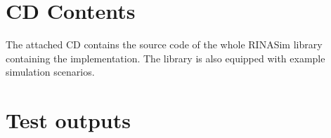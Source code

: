 \chapter{CD Contents}
    The attached CD contains the source code of the whole RINASim library containing the implementation. The library is also equipped with example simulation scenarios.

\chapter{Test outputs}